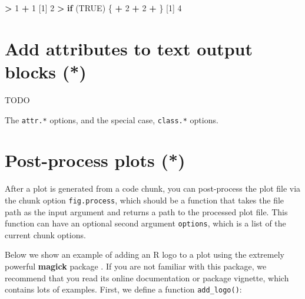 \documentclass[
  11pt,
]{krantz}
\newenvironment{Shaded}{\begin{snugshade}}{\end{snugshade}}
\newcommand{\ControlFlowTok}[1]{\textcolor[rgb]{0.27,0.27,0.27}{\textbf{#1}}}
\newcommand{\DecValTok}[1]{\textcolor[rgb]{0.06,0.06,0.06}{#1}}
\newcommand{\NormalTok}[1]{#1}
\newcommand{\OperatorTok}[1]{\textcolor[rgb]{0.43,0.43,0.43}{\textbf{#1}}}
\newcommand{\OtherTok}[1]{\textcolor[rgb]{0.37,0.37,0.37}{#1}}
\newcommand{\StringTok}[1]{\textcolor[rgb]{0.5,0.5,0.5}{#1}}
\begin{document}
\begin{Shaded}
\begin{Highlighting}[]
\OperatorTok{>}\StringTok{ }\DecValTok{1} \OperatorTok{+}\StringTok{ }\DecValTok{1}
\NormalTok{[}\DecValTok{1}\NormalTok{] }\DecValTok{2}
\OperatorTok{>}\StringTok{ }\ControlFlowTok{if}\NormalTok{ (}\OtherTok{TRUE}\NormalTok{) \{}
\OperatorTok{+}\StringTok{   }\DecValTok{2} \OperatorTok{+}\StringTok{ }\DecValTok{2}
\OperatorTok{+}\StringTok{ }\NormalTok{\}}
\NormalTok{[}\DecValTok{1}\NormalTok{] }\DecValTok{4}
\end{Highlighting}
\end{Shaded}

\hypertarget{attr-output}{%
\section{Add attributes to text output blocks (*)}\label{attr-output}}

TODO

The \texttt{attr.*} options, and the special case, \texttt{class.*} options.

\hypertarget{fig-process}{%
\section{Post-process plots (*)}\label{fig-process}}

After a plot is generated from a code chunk, you can post-process the plot file via the chunk option \texttt{fig.process}, which should be a function that takes the file path as the input argument and returns a path to the processed plot file. This function can have an optional second argument \texttt{options}, which is a list of the current chunk options.

Below we show an example of adding an R logo to a plot using the extremely powerful \textbf{magick} package \citep{R-magick}. If you are not familiar with this package, we recommend that you read its online documentation or package vignette, which contains lots of examples. First, we define a function \texttt{add\_logo()}:
\end{document}
